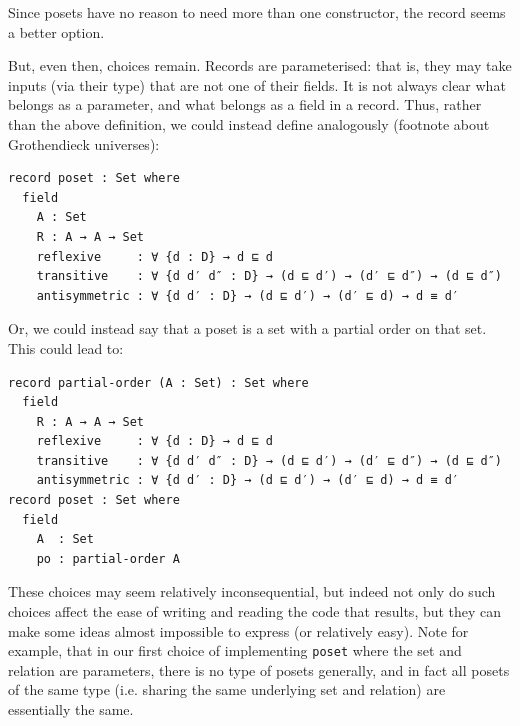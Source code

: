 \documentclass[12pt,a4paper,twoside,openright]{report}
\begin{document}
Since posets have no reason to need more than one constructor, the record seems a better option. 

But, even then, choices remain. Records are parameterised: that is, they may take inputs (via their type) that are not one of their fields. It is not always clear what belongs as a parameter, and what belongs as a field in a record. Thus, rather than the above definition, we could instead define analogously (footnote about Grothendieck universes):
\begin{verbatim}
record poset : Set where
  field
    A : Set
    R : A → A → Set
    reflexive     : ∀ {d : D} → d ⊑ d 
    transitive    : ∀ {d d′ d″ : D} → (d ⊑ d′) → (d′ ⊑ d″) → (d ⊑ d″)
    antisymmetric : ∀ {d d′ : D} → (d ⊑ d′) → (d′ ⊑ d) → d ≡ d′
\end{verbatim}

Or, we could instead say that a poset is a set with a partial order on that set. This could lead to:
\begin{verbatim}
record partial-order (A : Set) : Set where
  field
    R : A → A → Set
    reflexive     : ∀ {d : D} → d ⊑ d 
    transitive    : ∀ {d d′ d″ : D} → (d ⊑ d′) → (d′ ⊑ d″) → (d ⊑ d″)
    antisymmetric : ∀ {d d′ : D} → (d ⊑ d′) → (d′ ⊑ d) → d ≡ d′
record poset : Set where
  field
    A  : Set
    po : partial-order A
\end{verbatim}

These choices may seem relatively inconsequential, but indeed not only do such choices affect the ease of writing and reading the code that results, but they can make some ideas almost impossible to express (or relatively easy). Note for example, that in our first choice of implementing \texttt{poset} where the set and relation are parameters, there is no type of posets generally, and in fact all posets of the same type (i.e. sharing the same underlying set and relation) are essentially the same. 
\end{document}
